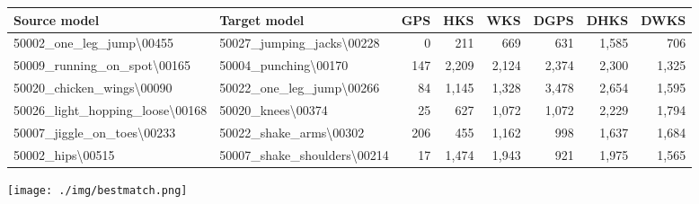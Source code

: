 \documentclass[5p,twocolumn,10pt,times]{elsarticle}
\begin{document}
\begin{center}
\begin{table*}
\begin{tabular}{l|l|r|r|r|r|r|r}
    Source model & Target model & GPS & HKS & WKS & DGPS & DHKS & DWKS \\
    \hline
    50002\_one\_leg\_jump\textbackslash00455 & 50027\_jumping\_jacks\textbackslash00228 & 0 & 211 & 669 & 631 & 1,585 & 706 \\
    50009\_running\_on\_spot\textbackslash00165 & 50004\_punching\textbackslash00170 & 147 & 2,209 & 2,124 & 2,374 & 2,300 & 1,325 \\
    50020\_chicken\_wings\textbackslash00090 & 50022\_one\_leg\_jump\textbackslash00266 & 84 & 1,145 & 1,328 & 3,478 & 2,654 & 1,595 \\
    50026\_light\_hopping\_loose\textbackslash00168 & 50020\_knees\textbackslash00374 & 25 & 627 & 1,072 & 1,072 & 2,229 & 1,794 \\
    50007\_jiggle\_on\_toes\textbackslash00233 & 50022\_shake\_arms\textbackslash00302 & 206 & 455 & 1,162 & 998 & 1,637 & 1,684 \\
    50002\_hips\textbackslash00515 & 50007\_shake\_shoulders\textbackslash00214 & 17 & 1,474 & 1,943 & 921 & 1,975 & 1,565
\end{tabular}

\caption{Statistics of correct matching pairs for the results presented in Figure~\ref{fig:bestmatch}. Each of the rows in the table corresponds to each of the rows in Figure~\ref{fig:bestmatch} in the same order. The left two entries of each row show the id number of an individual and the name and the frame number of a motion, following the same naming convention in Dyna database. Different id numbers indicate different body shapes, and different motion names and frame numbers indicate different body postures. The rest of the entries show the number of correct matching pairs for each of the methods.}
\label{tbl:DynaTest}
\end{table*}
\end{center}


\begin{figure*}
	\begin{center}
			\texttt{[image: ./img/bestmatch.png]}
	\end{center}
	\caption{Visualization of the matches within the geodesic distortion of 5\% of the shape diameter. Each row shows a comparison between the GPS, HKS, and WKS, and their embeddings, namely DeepGPS, DeepHKS, and DeepWKS, respectively. Different models in different rows are randomly picked from the test dataset for the visualization. For a fair comparison, no sophisticated algorithm such as \cite{leordeanu2005spectral} is used, but a simple nearest neighbor search based on the Euclidean distances between the shape descriptors.}
	\label{fig:bestmatch}
\end{figure*}
\end{document}
